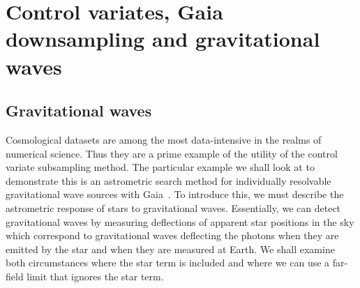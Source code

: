 \chapter{Control variates, Gaia downsampling and gravitational waves}\label{ch:chapter4}

\ifpdf
    \graphicspath{{Chapter4/Figs/Raster/}{Chapter4/Figs/PDF/}{Chapter4/Figs/}}
\else
    \graphicspath{{Chapter4/Figs/Vector/}{Chapter4/Figs/}}
\fi

\section{Gravitational waves}
Cosmological datasets are among the most data-intensive in the realms of numerical science. Thus they are a prime example of the utility of the control variate subsampling method. The particular example we shall look at to demonstrate this is an astrometric search method for individually resolvable gravitational wave sources with Gaia~\cite{Mihaylov_2020}. To introduce this, we must describe the astrometric response of stars to gravitational waves. Essentially, we can detect gravitational waves by measuring deflections of apparent star positions in the sky which correspond to gravitational waves deflecting the photons when they are emitted by the star and when they are measured at Earth. We shall examine both circumstances where the star term is included and where we can use a far-field limit that ignores the star term.

